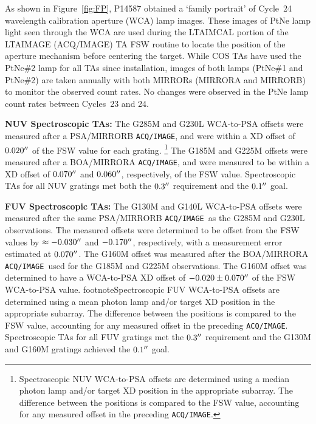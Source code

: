 \documentclass{stsci_report}
\def\arcsec{\hbox{$^{\prime\prime}$}}
\newcommand{\tacq}[1]{\texttt{ACQ/#1}}
\begin{document}
\begin{description}
	As shown in Figure~\ref{fig:FP}, P14587 obtained a `family portrait' of Cycle~24 wavelength calibration aperture (WCA) lamp images. These images of PtNe lamp light seen through the WCA
	are used during the LTAIMCAL portion of the LTAIMAGE (ACQ/IMAGE) TA FSW routine to locate the position of the aperture mechanism before centering the target.
	While COS TAs have used the PtNe\#2 lamp for all TAs since installation, images of both lamps (PtNe\#1 and PtNe\#2) are taken annually with both MIRRORs
	(MIRRORA and MIRRORB) to monitor the observed count rates. No changes were observed in the PtNe lamp count rates between Cycles~23 and 24.
	\clearpage
\item{\bf NUV Spectroscopic TAs:}
	The G285M and G230L WCA-to-PSA offsets were measured after a PSA/MIRRORB \tacq{IMAGE}, and were within a XD offset of $0.020\arcsec$ of the FSW value for each grating.
	\footnote{Spectroscopic NUV WCA-to-PSA offsets are determined using a median photon lamp and/or target XD position in the appropriate subarray. The difference between the positions is compared to the FSW value, accounting for any measured offset in the preceding \tacq{IMAGE}.}
	The G185M and G225M offsets were measured after a BOA/MIRRORA \tacq{IMAGE}, and were measured to be within a XD offset of $0.070\arcsec$ and $0.060\arcsec$, respectively, of the FSW value.
	Spectroscopic TAs for all NUV gratings met both the $0.3\arcsec$ requirement and the $0.1\arcsec$ goal.
\item{\bf FUV Spectroscopic TAs:}
	The G130M and G140L WCA-to-PSA offsets were measured after the same PSA/MIRRORB \tacq{IMAGE}~as the G285M and G230L observations.
	The measured offsets were determined to be offset from the FSW values by $\approx -0.030\arcsec$ and $-0.170\arcsec$, respectively, with a measurement error estimated at $0.070\arcsec$.
	The G160M offset was measured after the BOA/MIRRORA \tacq{IMAGE}~used for the G185M and G225M observations. The G160M offset was determined to have a WCA-to-PSA XD offset of $-0.020 \pm 0.070\arcsec$ of the FSW WCA-to-PSA value.
footnote{Spectroscopic FUV WCA-to-PSA offsets are determined using a mean photon lamp and/or target XD position in the appropriate subarray. The difference between the positions is compared to the FSW value, accounting for any measured offset in the preceding \tacq{IMAGE}.}
	Spectroscopic TAs for all FUV gratings met the $0.3\arcsec$ requirement and the G130M and G160M gratings achieved the $0.1\arcsec$ goal.

\end{description}
\vspace{-0.3cm}
\end{document}
